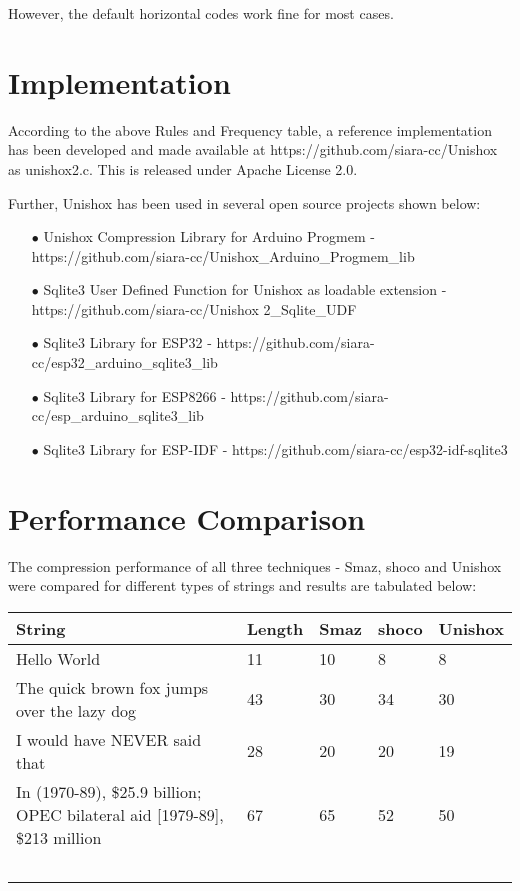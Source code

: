 \documentclass[]{article}
\begin{document}
However, the default horizontal codes work fine for most cases.

\section{Implementation}

According to the above Rules and Frequency table, a reference implementation has been developed and made available at https://github.com/siara-cc/Unishox as unishox2.c.  This is released under Apache License 2.0.

Further, Unishox has been used in several open source projects shown below:

\begin{itemize}
	\item[$\bullet$] Unishox Compression Library for Arduino Progmem - https://github.com/siara-cc/Unishox\_Arduino\_Progmem\_lib
	\item[$\bullet$] Sqlite3 User Defined Function for Unishox as loadable extension - https://github.com/siara-cc/Unishox 2\_Sqlite\_UDF
	\item[$\bullet$] Sqlite3 Library for ESP32 - https://github.com/siara-cc/esp32\_arduino\_sqlite3\_lib
	\item[$\bullet$] Sqlite3 Library for ESP8266 - https://github.com/siara-cc/esp\_arduino\_sqlite3\_lib
	\item[$\bullet$] Sqlite3 Library for ESP-IDF - https://github.com/siara-cc/esp32-idf-sqlite3
\end{itemize}

\section{Performance Comparison}

The compression performance of all three techniques - Smaz, shoco and Unishox were compared for different types of strings and results are tabulated below:

\begin{center}
\begin{tabular}{ | p{} | p{} | p{} | p{} | p{} |} \hline
﻿\textbf{String} & ﻿\textbf{Length} & ﻿\textbf{Smaz} & ﻿\textbf{shoco} & ﻿\textbf{Unishox} \\ \hline
Hello World & 11 & 10 & 8 & 8 \\ \hline
The quick brown fox jumps over the lazy dog & 43 & 30 & 34 & 30 \\ \hline
I would have NEVER said that & 28 & 20 & 20 & 19 \\ \hline
In (1970-89), \$25.9 billion; OPEC bilateral aid [1979-89], \$213 million & 67 & 65 & 52 & 50 \\ \hline
	﻿\end{tabular}
\end{center}
\end{document}
